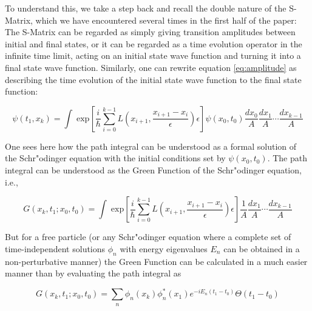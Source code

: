 \documentclass[12pt]{article}
\begin{document}
To understand this, we take a step back and recall the double nature of the S-Matrix, which we have encountered several times in the first half of the paper: The S-Matrix can be regarded as simply giving transition amplitudes between initial and final states, or it can be regarded as a time evolution operator in the infinite time limit, acting on an initial state wave function and turning it into a final state wave function. Similarly, one can rewrite equation \ref{eq:amplitude} as describing the time evolution of the initial state wave function to the final state function:

\begin{equation}
\label{eq:amplitude2}
\psi (t_1, x_k)  =   \int  \; \mathrm{exp}\left[ \frac{i}{\hbar} \sum_{i=0}^{k-1} L \left( x_{i+1}, \frac{x_{i+1}-x_i}{\epsilon} \right) \epsilon \right] \psi (x_0, t_0) \frac{dx_0}{A} \frac{dx_1}{A} \cdots \frac{dx_{k-1}}{A} 
\end{equation}

One sees here how the path integral can be understood as a formal solution of the Schr"odinger equation with the initial conditions set by $\psi (x_0, t_0)$. The path integral can be understood as the Green Function of the Schr"odinger equation, i.e.,

\begin{equation}
G(x_k, t_1; x_0, t_0) = \int  \; \mathrm{exp}\left[ \frac{i}{\hbar} \sum_{i=0}^{k-1} L \left( x_{i+1}, \frac{x_{i+1}-x_i}{\epsilon} \right) \epsilon \right] \frac{1}{A} \frac{dx_1}{A} \cdots \frac{dx_{k-1}}{A}
\end{equation}

But for a free particle (or any Schr"odinger equation where a complete set of time-independent solutions $\phi_n$ with energy eigenvalues $E_n$ can be obtained in a non-perturbative manner) the Green Function can be calculated in a much easier manner than by evaluating the path integral as \citep[eq. 3]{feynman_1949_theory}

\begin{equation}
\label{eq:green}
G(x_k, t_1; x_0, t_0) = \sum_n \phi_n (x_k) \phi_n^{\ast} (x_1) e^{-i E_n (t_1 - t_0)} \Theta (t_1-t_0)
\end{equation}
\end{document}
